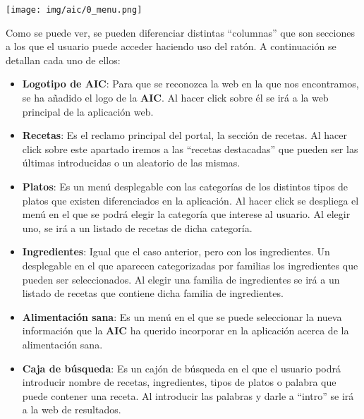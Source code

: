 \documentclass{\ClassPath/viu-tfm-template}
\begin{document}
\begin{center}
    \vspace{-10pt}
    \texttt{[image: img/aic/0\_menu.png]}
    \vspace{-20pt}
\end{center}

Como se puede ver, se pueden diferenciar distintas “columnas” que son secciones a los que el usuario puede acceder haciendo uso del ratón. A continuación se detallan cada uno de ellos:

\vspace{-1em}
\begin{itemize}
    \item \textbf{Logotipo de AIC}: Para que se reconozca la web en la que nos encontramos, se ha añadido el logo de la \textbf{AIC}. Al hacer click sobre él se irá a la web principal de la aplicación web.
    \item \textbf{Recetas}: Es el reclamo principal del portal, la sección de recetas. Al hacer click sobre este apartado iremos a las “recetas destacadas” que pueden ser las últimas introducidas o un aleatorio de las mismas.

    \item \textbf{Platos}: Es un menú desplegable con las categorías de los distintos tipos de platos que existen diferenciados en la aplicación. Al hacer click se despliega el menú en el que se podrá elegir la categoría que interese al usuario. Al elegir uno, se irá a un listado de recetas de dicha categoría.

    \item \textbf{Ingredientes}: Igual que el caso anterior, pero con los ingredientes. Un desplegable en el que aparecen categorizadas por familias los ingredientes que pueden ser seleccionados. Al elegir una familia de ingredientes se irá a un listado de recetas que contiene dicha familia de ingredientes.

    \item \textbf{Alimentación sana}: Es un menú en el que se puede seleccionar la nueva información que la \textbf{AIC} ha querido incorporar en la aplicación acerca de la alimentación sana.

    \item \textbf{Caja de búsqueda}: Es un cajón de búsqueda en el que el usuario podrá introducir nombre de recetas, ingredientes, tipos de platos o palabra que puede contener una receta. Al introducir las palabras y darle a “intro” se irá a la web de resultados.


\end{itemize}
\end{document}
